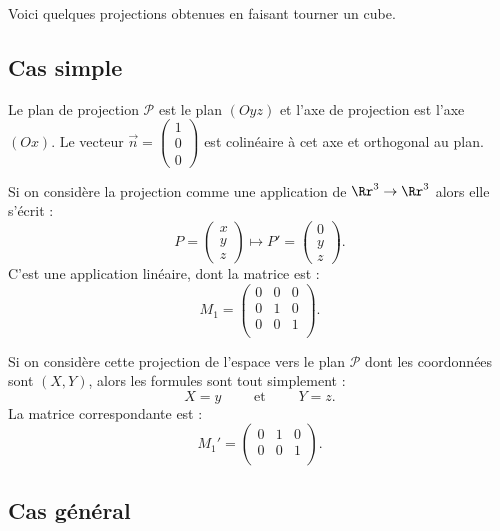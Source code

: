 \documentclass[11pt,class=report,crop=false]{standalone}
\begin{document}


Voici quelques projections obtenues en faisant tourner un cube.

\subsection{Cas simple}


Le plan de projection $\mathcal{P}$ est le plan $(Oyz)$ et l'axe de projection est l'axe $(Ox)$. Le vecteur $\vec n = \left(\begin{smallmatrix}1\\0\\0\end{smallmatrix}\right)$ est colinéaire à cet axe et orthogonal au plan.


Si on considère la projection comme une application de $\Rr^3 \to \Rr^3$ alors elle s'écrit :
$$P =  \begin{pmatrix}x\\y\\z\end{pmatrix} \longmapsto P' =  \begin{pmatrix}0\\y\\z\end{pmatrix}.$$
C'est une application linéaire, dont la matrice est :
$$M_1 = 
\begin{pmatrix}
0&0&0\\
0&1&0\\
0&0&1\\
\end{pmatrix}.
$$


Si on considère cette projection de l'espace vers le plan $\mathcal{P}$ dont les coordonnées sont $(X,Y)$, alors les formules sont tout simplement :
 $$X=y \qquad \text{ et } \qquad Y=z.$$
La matrice correspondante est :
$$
M_1' = \begin{pmatrix}
0&1&0\\
0&0&1\\
\end{pmatrix}.
$$

\subsection{Cas général}
\end{document}
